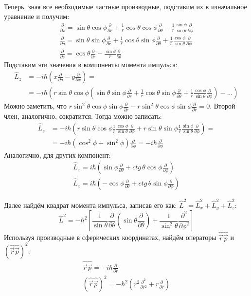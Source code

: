 Теперь, зная все необходимые частные производные, подставим их в изначальное уравнение и получим:
\begin{gather*}
\frac{\partial }{\partial x} = \sin\theta\cos\phi\frac{\partial}{\partial r} + \frac{1}{r}\cos\theta\cos\phi\frac{\partial}{\partial \theta} -\frac{1}{r}\frac{\sin\phi}{\sin\theta}\frac{\partial}{\partial\phi}\\
\frac{\partial }{\partial y} = \sin\theta\sin\phi\frac{\partial}{\partial r} + \frac{1}{r}\cos\theta\sin\phi\frac{\partial}{\partial \theta} +\frac{1}{r}\frac{\cos\phi}{\sin\theta}\frac{\partial}{\partial\phi}\\
\frac{\partial }{\partial z} = \cos\theta\frac{\partial}{\partial r} -\frac{\sin\theta}{r}\frac{\partial}{\partial \theta}
\end{gather*}
Подставим эти значения в компоненты момента импульса:
\begin{align*}
\hat{L}_z &= -i\hbar(x\frac{\partial}{\partial y} - y\frac{\partial}{\partial x}) =\\
&= -i\hbar\left(r\sin\theta\cos\phi\left(\sin\theta\sin\phi\frac{\partial}{\partial r} + \frac{1}{r}\cos\theta\sin\phi\frac{\partial}{\partial \theta} +\frac{1}{r}\frac{\cos\phi}{\sin\theta}\frac{\partial}{\partial\phi}\right) - ...\right)
\end{align*}
Можно заметить, что $r\sin^2\theta \cos\phi \sin\phi \frac{\partial}{\partial r} - r\sin^2\theta\cos\phi\sin\phi\frac{\partial}{\partial r} = 0$. Второй член, аналогично, сократится. Тогда можно записать:
\begin{align*}
    \hat{L}_z &= -i\hbar\left(r\sin\theta\cos\phi\frac{1}{r}\frac{\cos\phi}{\sin\theta}\frac{\partial}{\partial \phi} + r\sin\theta\sin\phi\frac{1}{r}\frac{\sin\phi}{\sin\theta}\frac{\partial}{\partial \phi} \right) =\\ 
    &= -i\hbar \left(\cos^2\phi+\sin^2\phi\right)\frac{\partial}{\partial \phi} = -i\hbar\frac{\partial}{\partial \phi}
\end{align*}
Аналогично, для других компонент:
\begin{gather*}
\hat{L}_x = i\hbar\left(\sin\phi\frac{\partial}{\partial \theta} + ctg\,\theta\cos\phi \frac{\partial}{\partial \phi}\right)\\
\hat{L}_x = i\hbar\left(-\cos\phi\frac{\partial}{\partial \theta} + ctg\,\theta\sin\phi \frac{\partial}{\partial \phi}\right)
\end{gather*}

Далее найдём квадрат момента импульса, записав его как: $\hat{L}^2 = \hat{L}^2_x + \hat{L}^2_y + \hat{L}^2_z$:
\[
\hat{L}^2 = -\hbar^2\left[\frac{1}{\sin\theta}\frac{\partial}{\partial \theta}\left( \sin\theta\frac{\partial}{\partial \theta} \right) + \frac{1}{\sin^2\theta}\frac{\partial^2}{\partial\phi^2}\right]
\]
Используя производные в сферических координатах, найдём операторы $\hat{\Vec{r}}\hat{\Vec{p}}$ и $(\hat{\Vec{r}}\hat{\Vec{p}})^2$:
\begin{gather*}
\hat{\Vec{r}}\hat{\Vec{p}} = -i\hbar\frac{\partial}{\partial r}\\
(\hat{\Vec{r}}\hat{\Vec{p}})^2 = -\hbar^2\left( r^2\frac{\partial^2}{\partial r^2} + r\frac{\partial}{\partial r}\right)
\end{gather*}

